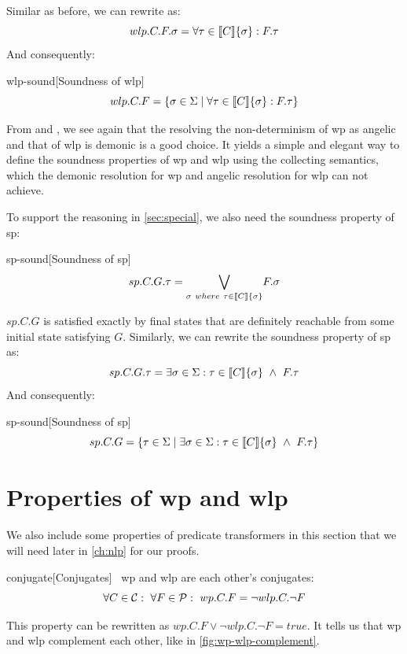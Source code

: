 Similar as before, we can rewrite  as: 
\[
  wlp.C.F.\sigma = \forall \tau\in\llbracket C \rrbracket\{\sigma\}: F.\tau
\]
And consequently: 
\begin{corollary}{wlp-sound}[Soundness of wlp]
\[
  wlp.C.F = \{ \sigma\in{\Sigma}\mid \forall \tau\in\llbracket C \rrbracket\{\sigma\}: F.\tau\}
\]  
\end{corollary}

From  and , we see again that the resolving the non-determinism of wp as angelic and that of wlp is demonic is a good choice. 
It yields a simple and elegant way to define the soundness properties of wp and wlp using the collecting semantics, which the demonic resolution for wp and angelic resolution for wlp can not achieve. 

To support the reasoning in \autoref{sec:special}, we also need the soundness property of sp: 
\begin{theorem}{sp-sound}[Soundness of sp]~{\normalfont\cite{vries11,zhang22}}
\ \vspace{-1.5mm}
\[
sp.C.G.\tau = \underset{\sigma\ where\ \tau\in\llbracket C \rrbracket\{\sigma\}}{\bigvee} F.\sigma
\]
\end{theorem}

$sp.C.G$ is satisfied exactly by final states that are definitely reachable from some initial state satisfying $G$. 
Similarly, we can rewrite the soundness property of sp as: 
\[sp.C.G.\tau = \exists \sigma\in{\Sigma}:\tau\in\llbracket C \rrbracket\{\sigma\}\ \wedge\ F.\tau\]
And consequently: 
\begin{corollary}{sp-sound}[Soundness of sp]
  \[sp.C.G = \{\tau\in{\Sigma}\mid \exists\sigma\in{\Sigma}:\tau\in\llbracket C \rrbracket\{\sigma\}\ \wedge\ F.\tau\}\]
\end{corollary}

\section{Properties of wp and wlp}\label{sec:prop}
We also include some properties of predicate transformers in this section that we will need later in \autoref{ch:nlp} for our proofs. 
\begin{theorem}{conjugate}[Conjugates]~{\normalfont\cite{zhang22}}
  wp and wlp are each other's conjugates:
  \[\forall C\in\mathcal{C}:\ \forall F\in\mathcal{P}:\ wp.C.F = \neg wlp.C.\neg F\]
\end{theorem}
This property can be rewritten as $wp.C.F\vee \neg wlp.C.\neg F = true$.
It tells us that wp and wlp complement each other, like in \autoref{fig:wp-wlp-complement}. 

